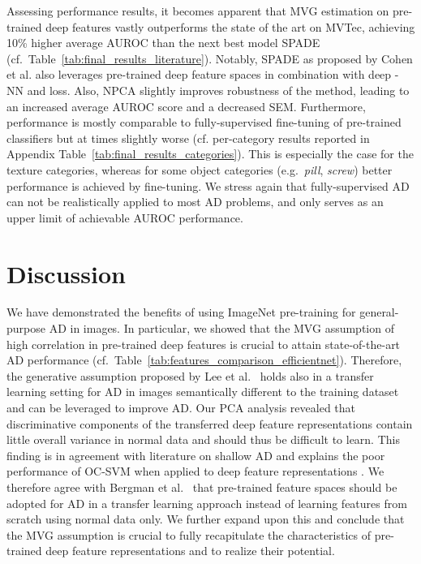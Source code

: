 \documentclass[conference, a4paper]{./template/IEEEtran}
\begin{document}
Assessing performance results, it becomes apparent that MVG estimation on pre-trained deep features vastly outperforms the state of the art on MVTec, achieving 10\% higher average AUROC than the next best model SPADE (cf.\ Table~\ref{tab:final_results_literature}).
Notably, SPADE as proposed by Cohen et al. \cite{Cohen2020} also leverages pre-trained deep feature spaces in combination with deep -NN and  loss. Also, NPCA slightly improves robustness of the method, leading to an increased average AUROC score and a decreased SEM. Furthermore, performance is mostly comparable to fully-supervised fine-tuning of pre-trained classifiers but at times slightly worse (cf. per-category results reported in Appendix Table~\ref{tab:final_results_categories}).
This is especially the case for the texture categories, whereas for some object categories (e.g.\ \textit{pill}, \textit{screw}) better performance is achieved by fine-tuning.
We stress again that fully-supervised AD can not be realistically applied to most AD problems, and only serves as an upper limit of achievable AUROC performance.


\section{Discussion}
We have demonstrated the benefits of using ImageNet pre-training for general-purpose AD in images.
In particular, we showed that the MVG assumption of high correlation in pre-trained deep features is crucial to attain state-of-the-art AD performance (cf.\ Table~\ref{tab:features_comparison_efficientnet}).
Therefore, the generative assumption proposed by Lee et al.\ \cite{Lee2018} holds also in a transfer learning setting for AD in images semantically different to the training dataset and can be leveraged to improve AD.
Our PCA analysis revealed that discriminative components of the transferred deep feature representations contain little overall variance in normal data and should thus be difficult to learn.
This finding is in agreement with literature on shallow AD \cite{Tax2003} and explains the poor performance of OC-SVM when applied to deep feature representations \cite{MefrazKhan2014}.
We therefore agree with Bergman et al.\ \cite{Bergman2020a} that pre-trained feature spaces should be adopted for AD in a transfer learning approach instead of learning features from scratch using normal data only.
We further expand upon this and conclude that the MVG assumption is crucial to fully recapitulate the characteristics of pre-trained deep feature representations and to realize their potential.
\end{document}
